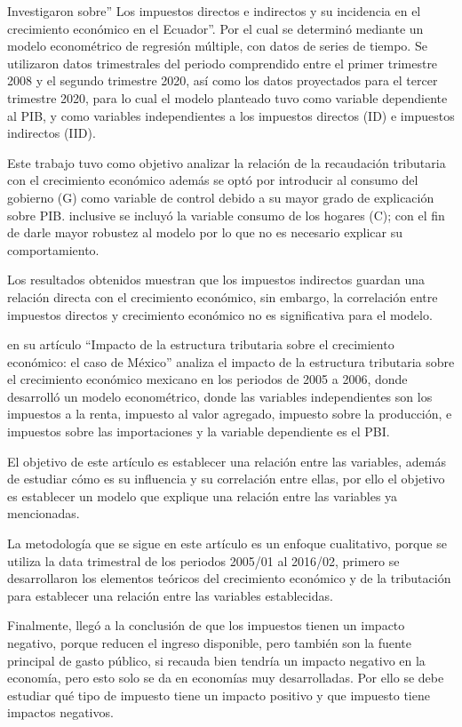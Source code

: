 \documentclass[
  letterpaper,
  DIV=11,
  numbers=noendperiod]{scrartcl}
\begin{document}
\textcite{beltran-ayala_impuestos_2020} Investigaron sobre'' Los
impuestos directos e indirectos y su incidencia en el crecimiento
económico en el Ecuador''. Por el cual se determinó mediante un modelo
econométrico de regresión múltiple, con datos de series de tiempo. Se
utilizaron datos trimestrales del periodo comprendido entre el primer
trimestre 2008 y el segundo trimestre 2020, así como los datos
proyectados para el tercer trimestre 2020, para lo cual el modelo
planteado tuvo como variable dependiente al PIB, y como variables
independientes a los impuestos directos (ID) e impuestos indirectos
(IID).

Este trabajo tuvo como objetivo analizar la relación de la recaudación
tributaria con el crecimiento económico además se optó por introducir al
consumo del gobierno (G) como variable de control debido a su mayor
grado de explicación sobre PIB. inclusive se incluyó la variable consumo
de los hogares (C); con el fin de darle mayor robustez al modelo por lo
que no es necesario explicar su comportamiento.

Los resultados obtenidos muestran que los impuestos indirectos guardan
una relación directa con el crecimiento económico, sin embargo, la
correlación entre impuestos directos y crecimiento económico no es
significativa para el modelo.

\textcite{banda-ortiz_impacto_2018} en su artículo ``Impacto de la
estructura tributaria sobre el crecimiento económico: el caso de
México'' analiza el impacto de la estructura tributaria sobre el
crecimiento económico mexicano en los periodos de 2005 a 2006, donde
desarrolló un modelo econométrico, donde las variables independientes
son los impuestos a la renta, impuesto al valor agregado, impuesto sobre
la producción, e impuestos sobre las importaciones y la variable
dependiente es el PBI.

El objetivo de este artículo es establecer una relación entre las
variables, además de estudiar cómo es su influencia y su correlación
entre ellas, por ello el objetivo es establecer un modelo que explique
una relación entre las variables ya mencionadas.

La metodología que se sigue en este artículo es un enfoque cualitativo,
porque se utiliza la data trimestral de los periodos 2005/01 al 2016/02,
primero se desarrollaron los elementos teóricos del crecimiento
económico y de la tributación para establecer una relación entre las
variables establecidas.

Finalmente, llegó a la conclusión de que los impuestos tienen un impacto
negativo, porque reducen el ingreso disponible, pero también son la
fuente principal de gasto público, si recauda bien tendría un impacto
negativo en la economía, pero esto solo se da en economías muy
desarrolladas. Por ello se debe estudiar qué tipo de impuesto tiene un
impacto positivo y que impuesto tiene impactos negativos.
\end{document}
